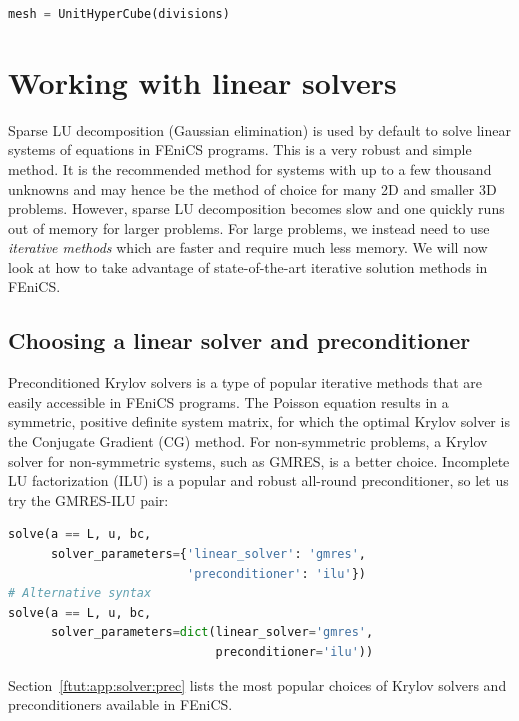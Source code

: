 \documentclass[graybox,envcountchap,sectrefs,final]{svmonodo}
\begin{document}
\begin{lstlisting}[language=Python,style=graycolor]
mesh = UnitHyperCube(divisions)
\end{lstlisting}

\section{Working with linear solvers}
\label{ch:poisson0:solve:prm}

Sparse LU decomposition (Gaussian elimination) is used by default to
solve linear systems of equations in FEniCS programs.  This is a very
robust and simple method. It is the recommended method for systems
with up to a few thousand unknowns and may hence be the method of
choice for many 2D and smaller 3D problems. However, sparse LU
decomposition becomes slow and one quickly runs out of memory for
larger problems. For large problems, we instead need to use \emph{iterative
methods} which are faster and require much less memory. We will now
look at how to take advantage of state-of-the-art iterative solution
methods in FEniCS.

\subsection{Choosing a linear solver and preconditioner}


Preconditioned Krylov solvers is a type of popular iterative methods
that are easily accessible in FEniCS programs. The Poisson equation
results in a symmetric, positive definite system matrix, for which the
optimal Krylov solver is the Conjugate Gradient (CG) method. For
non-symmetric problems, a Krylov solver for non-symmetric systems,
such as GMRES, is a better choice. Incomplete LU factorization (ILU)
is a popular and robust all-round preconditioner, so let us try the
GMRES-ILU pair:

\begin{lstlisting}[language=Python,style=graycolor]
solve(a == L, u, bc,
      solver_parameters={'linear_solver': 'gmres',
                         'preconditioner': 'ilu'})
# Alternative syntax
solve(a == L, u, bc,
      solver_parameters=dict(linear_solver='gmres',
                             preconditioner='ilu'))
\end{lstlisting}
Section~\ref{ftut:app:solver:prec} lists the most popular choices of
Krylov solvers and preconditioners available in FEniCS.
\end{document}
